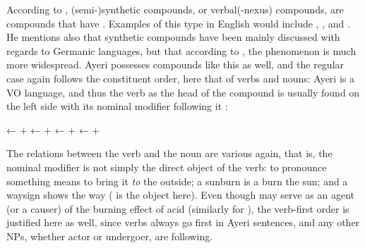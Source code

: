 According to \citet{bauer2001}, (semi-)synthetic compounds, or verbal(-nexus) 
compounds, are compounds that have . Examples of this type in English would include 
, , and . He mentions also 
that synthetic compounds have been mainly discussed with regards to Germanic 
languages, but that according to \citet[3608]{lieber1994}, the phenomenon is 
much more widespread. Ayeri possesses compounds like this as well, and the 
regular case again follows the constituent order, here that of verbs and nouns: 
Ayeri is a VO language, and thus the verb as the head of the compound is 
usually found on the left side with its nominal modifier following it 
\citep[129--133]{gaeta2008}:

\pex
	\a {}
		← 
		+ 
	\a {}
		← 
		+ 
	\a {}
		← 
		+ 
	\a {}
		← 
		+ 
\xe

The relations between the verb and the noun are various again, that is, the 
nominal modifier is not simply the direct object of the verb: to pronounce 
something means to bring it \emph{to} the outside; a sunburn is a burn 
 the sun; and a waysign shows the way ( is 
the object here). Even though  may serve as an agent (or a 
causer) of the burning effect of acid (similarly for 
), the verb-first order is justified here as 
well, since verbs always go first in Ayeri sentences, and any other NPs, 
whether actor or undergoer, are following.%

